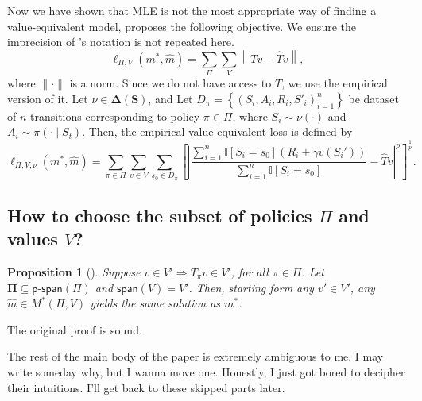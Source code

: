 \documentclass[a4paper]{article}
\theoremstyle{definition}
\theoremstyle{remark}
\theoremstyle{plain}
\newtheorem{proposition}{Proposition}
\newcommand{\bS}{\mathbf{S}}
\newcommand{\bPi}{\mathbf{\Pi}}
\newcommand{\bDelta}{\mathbf{\Delta}}
\newcommand{\II}{\mathbb{I}}
\begin{document}
%
Now we have shown that MLE is not the most appropriate way of finding a value-equivalent model, \citet{grimm2020value} proposes the following objective. We ensure the imprecision of \citet{grimm2020value}'s notation is not repeated here.
%
\begin{equation*}
    \ell_{\Pi, V}(m^*, \hat{m}) = \sum_\Pi\sum_V \left\lVert Tv - \hat{T}v \right\rVert,
\end{equation*}
where $\lVert \cdot \rVert$ is a norm. Since we do not have access to $T$, we use the empirical version of it. Let $\nu \in \bDelta(\bS)$, and Let $D_\pi = \left\{\left(S_i, A_i, R_i, S'_i \right)_{i=1}^{n} \right\}$ be dataset of $n$ transitions corresponding to policy $\pi \in \Pi$, where $S_i \sim \nu(\cdot)$ and $A_i \sim \pi(\cdot \mid S_t)$. Then, the empirical value-equivalent loss is defined by
%
\begin{equation*}
    \ell_{\Pi, V, \nu}(m^*, \hat{m}) = \sum_{\pi \in \Pi}\sum_{v \in V}\sum_{s_0 \in D_\pi}\left[\left\lvert \frac{\sum_{i = 1}^{n}\II\left[S_i = s_0 \right]\left(R_i + \gamma v\left(S_i'\right) \right)}{\sum_{i = 1}^{n}\II\left[S_i = s_0 \right]} - \hat{T}v \right\rvert^p\right]^{\frac{1}{p}}.
\end{equation*}

\subsection{How to choose the subset of policies \texorpdfstring{$\Pi$}{} and values \texorpdfstring{\normalfont$V$}{}?}
\begin{proposition}[{\normalfont\citet[Proposition 4]{grimm2020value}}]
    Suppose $v \in V' \Rightarrow T_\pi v \in V'$, for all $\pi \in \Pi$. Let $\bPi \subseteq \textsf{p-span}(\Pi)$ and $\textsf{span}(V) = V'$. Then, starting form any $v' \in V'$, any $\hat{m} \in M^*(\Pi, V)$ yields the same solution as $m^*$.
\end{proposition}
The original proof is sound.

The rest of the main body of the paper is extremely ambiguous to me. I may write someday why, but I wanna move one. Honestly, I just got bored to decipher their intuitions. I'll get back to these skipped parts later.
\end{document}
